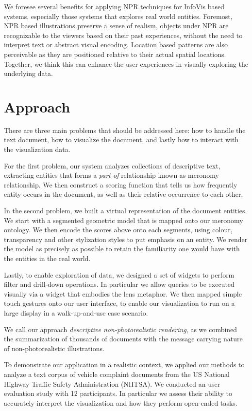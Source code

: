 We foresee several benefits for applying NPR techniques for InfoVis based
systems, especially those systems that explores real world entities. Foremost,
NPR based illustrations preserve a sense of realism, objects under NPR are
recognizable to the viewers based on their past experiences, without the need to
interpret text or abstract visual encoding. Location based patterns are also
perceivable as they are positioned relative to their actual spatial locations.
Together, we think this can enhance the user experiences in visually exploring
the underlying data.

 
\section{Approach}
There are three main problems that should be addressed here: how to handle the
text document, how to visualize the document, and lastly how to interact with
the visualization data.

For the first problem, our system analyzes collections of descriptive text,
extracting entities that forms a \emph{part-of} relationship known as meronomy
relationship. We then construct a scoring function that tells us how frequently
entity occurs in the document, as well as their relative occurrence to each
other. 
 
In the second problem, we built a virtual representation of the document
entities. We start with a segmented \threed geometric model that is mapped onto
our meronomy ontology. We then encode the scores above onto each segments, 
using colour, transparency and other stylization styles to put emphasis on  an
entity. We render the model as precisely as possible to retain the familiarity
one would have with the entities in the real world.
 
Lastly, to enable exploration of data, we designed a set of widgets to perform
filter and drill-down operations. In particular we allow queries to be executed
visually via a widget that embodies the lens metaphor. We then mapped simple
touch gestures onto our user interface, to enable our visualization to run on a
large display in a walk-up-and-use case scenario.

We call our approach \emph{descriptive non-photorealistic rendering}, as we combined
the summarization of thousands of documents with the message carrying nature of 
non-photorealistic illustrations.

To demonstrate our application in a realistic context, we applied our methods
to analyze a text corpus of vehicle complaint documents from the US National
Highway Traffic Safety Administration (NHTSA). We conducted an user evaluation 
study with 12 participants. In particular we assess their ability to accurately
interpret the visualization and how they perform open-ended tasks.


